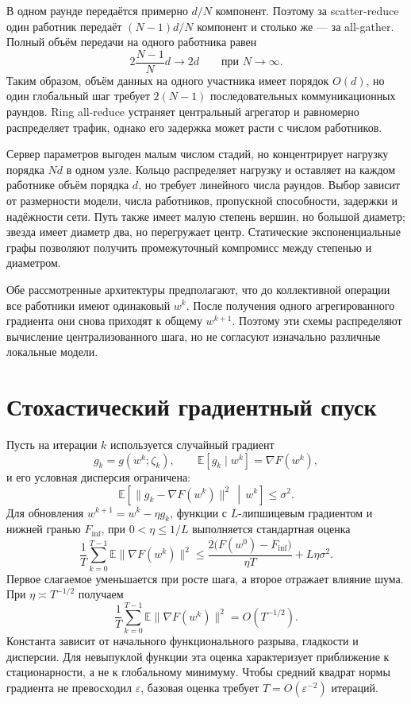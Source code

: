 В одном раунде передаётся примерно \(d/N\) компонент. Поэтому за
scatter-reduce один работник передаёт \((N-1)d/N\) компонент и столько
же --- за all-gather. Полный объём передачи на одного работника равен
\[
    2\frac{N-1}{N}d
    \longrightarrow
    2d
    \qquad
    \text{при }N\to\infty.
\]
Таким образом, объём данных на одного участника имеет порядок
\(O(d)\), но один глобальный шаг требует \(2(N-1)\) последовательных
коммуникационных раундов. Ring all-reduce устраняет центральный
агрегатор и равномерно распределяет трафик, однако его задержка может
расти с числом работников.

Сервер параметров выгоден малым числом стадий, но концентрирует
нагрузку порядка \(Nd\) в одном узле. Кольцо распределяет нагрузку и
оставляет на каждом работнике объём порядка \(d\), но требует
линейного числа раундов. Выбор зависит от размерности модели, числа
работников, пропускной способности, задержки и надёжности сети.
Путь также имеет малую степень вершин, но большой диаметр; звезда
имеет диаметр два, но перегружает центр. Статические экспоненциальные
графы позволяют получить промежуточный компромисс между степенью и
диаметром.

Обе рассмотренные архитектуры предполагают, что до коллективной
операции все работники имеют одинаковый \(w^k\). После получения
одного агрегированного градиента они снова приходят к общему
\(w^{k+1}\). Поэтому эти схемы распределяют вычисление
централизованного шага, но не согласуют изначально различные локальные
модели.

\section{Стохастический градиентный спуск}

Пусть на итерации \(k\) используется случайный градиент
\[
    g_k=g(w^k;\zeta_k),
    \qquad
    \mathbb E[g_k\mid w^k]=\nabla F(w^k),
\]
и его условная дисперсия ограничена:
\[
    \mathbb E\!\left[
        \lVert g_k-\nabla F(w^k)\rVert^2
        \,\middle|\,
        w^k
    \right]
    \le
    \sigma^2.
\]
Для обновления \(w^{k+1}=w^k-\eta g_k\), функции с
\(L\)-липшицевым градиентом и нижней гранью \(F_{\inf}\), при
\(0<\eta\le 1/L\) выполняется стандартная оценка
\[
    \frac1T
    \sum_{k=0}^{T-1}
    \mathbb E\lVert\nabla F(w^k)\rVert^2
    \le
    \frac{2\bigl(F(w^0)-F_{\inf}\bigr)}{\eta T}
    +
    L\eta\sigma^2.
\]
Первое слагаемое уменьшается при росте шага, а второе отражает влияние
шума. При \(\eta\asymp T^{-1/2}\) получаем
\[
    \frac1T
    \sum_{k=0}^{T-1}
    \mathbb E\lVert\nabla F(w^k)\rVert^2
    =
    O\!\left(T^{-1/2}\right).
\]
Константа зависит от начального функционального разрыва, гладкости и
дисперсии. Для невыпуклой функции эта оценка характеризует
приближение к стационарности, а не к глобальному минимуму. Чтобы
средний квадрат нормы градиента не превосходил \(\varepsilon\), базовая
оценка требует \(T=O(\varepsilon^{-2})\) итераций.

